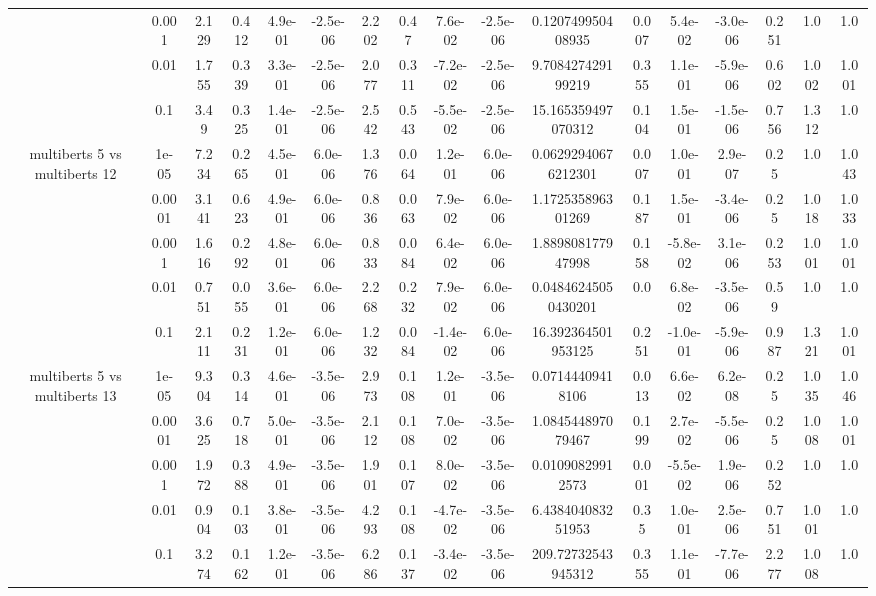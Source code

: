 \begin{tabular}{|c|c|c|c|c|c|c|c|c|c|c|c|c|c|c|c|c|}
 & 0.001 & 2.129 & 0.412 & 4.9e-01 & -2.5e-06 & 2.202 & 0.47 & 7.6e-02 & -2.5e-06 & 0.120749950408935 & 0.007 & 5.4e-02 & -3.0e-06 & 0.251 & 1.0 & 1.0 \\
 & 0.01 & 1.755 & 0.339 & 3.3e-01 & -2.5e-06 & 2.077 & 0.311 & -7.2e-02 & -2.5e-06 & 9.708427429199219 & 0.355 & 1.1e-01 & -5.9e-06 & 0.602 & 1.002 & 1.001 \\
 & 0.1 & 3.49 & 0.325 & 1.4e-01 & -2.5e-06 & 2.542 & 0.543 & -5.5e-02 & -2.5e-06 & 15.165359497070312 & 0.104 & 1.5e-01 & -1.5e-06 & 0.756 & 1.312 & 1.0 \\
\hline
\multirow{5}{*}{multiberts 5 vs multiberts 12} & 1e-05 & 7.234 & 0.265 & 4.5e-01 & 6.0e-06 & 1.376 & 0.064 & 1.2e-01 & 6.0e-06 & 0.06292940676212301 & 0.007 & 1.0e-01 & 2.9e-07 & 0.25 & 1.0 & 1.043 \\
 & 0.0001 & 3.141 & 0.623 & 4.9e-01 & 6.0e-06 & 0.836 & 0.063 & 7.9e-02 & 6.0e-06 & 1.172535896301269 & 0.187 & 1.5e-01 & -3.4e-06 & 0.25 & 1.018 & 1.033 \\
 & 0.001 & 1.616 & 0.292 & 4.8e-01 & 6.0e-06 & 0.833 & 0.084 & 6.4e-02 & 6.0e-06 & 1.889808177947998 & 0.158 & -5.8e-02 & 3.1e-06 & 0.253 & 1.001 & 1.001 \\
 & 0.01 & 0.751 & 0.055 & 3.6e-01 & 6.0e-06 & 2.268 & 0.232 & 7.9e-02 & 6.0e-06 & 0.04846245050430201 & 0.0 & 6.8e-02 & -3.5e-06 & 0.59 & 1.0 & 1.0 \\
 & 0.1 & 2.111 & 0.231 & 1.2e-01 & 6.0e-06 & 1.232 & 0.084 & -1.4e-02 & 6.0e-06 & 16.392364501953125 & 0.251 & -1.0e-01 & -5.9e-06 & 0.987 & 1.321 & 1.001 \\
\hline
\multirow{5}{*}{multiberts 5 vs multiberts 13} & 1e-05 & 9.304 & 0.314 & 4.6e-01 & -3.5e-06 & 2.973 & 0.108 & 1.2e-01 & -3.5e-06 & 0.07144409418106 & 0.013 & 6.6e-02 & 6.2e-08 & 0.25 & 1.035 & 1.046 \\
 & 0.0001 & 3.625 & 0.718 & 5.0e-01 & -3.5e-06 & 2.112 & 0.108 & 7.0e-02 & -3.5e-06 & 1.084544897079467 & 0.199 & 2.7e-02 & -5.5e-06 & 0.25 & 1.008 & 1.001 \\
 & 0.001 & 1.972 & 0.388 & 4.9e-01 & -3.5e-06 & 1.901 & 0.107 & 8.0e-02 & -3.5e-06 & 0.01090829912573 & 0.001 & -5.5e-02 & 1.9e-06 & 0.252 & 1.0 & 1.0 \\
 & 0.01 & 0.904 & 0.103 & 3.8e-01 & -3.5e-06 & 4.293 & 0.108 & -4.7e-02 & -3.5e-06 & 6.438404083251953 & 0.35 & 1.0e-01 & 2.5e-06 & 0.751 & 1.001 & 1.0 \\
 & 0.1 & 3.274 & 0.162 & 1.2e-01 & -3.5e-06 & 6.286 & 0.137 & -3.4e-02 & -3.5e-06 & 209.72732543945312 & 0.355 & 1.1e-01 & -7.7e-06 & 2.277 & 1.008 & 1.0 \\

\end{tabular}
